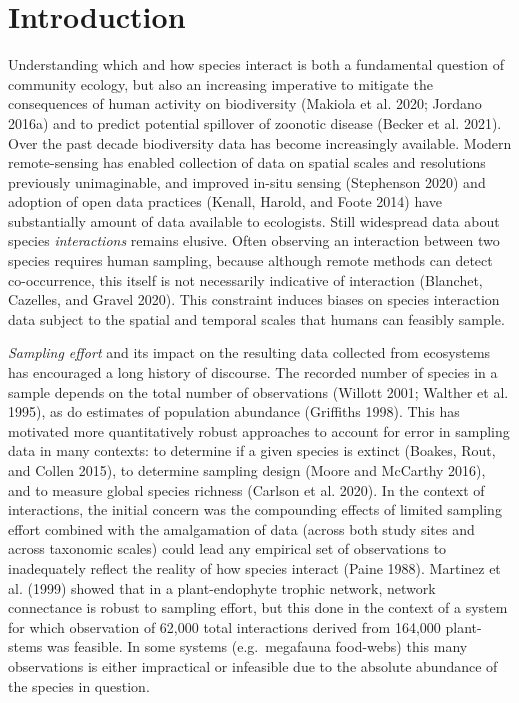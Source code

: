 \documentclass[11pt]{article}
\begin{document}
\hypertarget{introduction}{%
\section{Introduction}\label{introduction}}

Understanding which and how species interact is both a fundamental
question of community ecology, but also an increasing imperative to
mitigate the consequences of human activity on biodiversity (Makiola et
al. 2020; Jordano 2016a) and to predict potential spillover of zoonotic
disease (Becker et al. 2021). Over the past decade biodiversity data has
become increasingly available. Modern remote-sensing has enabled
collection of data on spatial scales and resolutions previously
unimaginable, and improved in-situ sensing (Stephenson 2020) and
adoption of open data practices (Kenall, Harold, and Foote 2014) have
substantially amount of data available to ecologists. Still widespread
data about species \emph{interactions} remains elusive. Often observing
an interaction between two species requires human sampling, because
although remote methods can detect co-occurrence, this itself is not
necessarily indicative of interaction (Blanchet, Cazelles, and Gravel
2020). This constraint induces biases on species interaction data
subject to the spatial and temporal scales that humans can feasibly
sample.

\emph{Sampling effort} and its impact on the resulting data collected
from ecosystems has encouraged a long history of discourse. The recorded
number of species in a sample depends on the total number of
observations (Willott 2001; Walther et al. 1995), as do estimates of
population abundance (Griffiths 1998). This has motivated more
quantitatively robust approaches to account for error in sampling data
in many contexts: to determine if a given species is extinct (Boakes,
Rout, and Collen 2015), to determine sampling design (Moore and McCarthy
2016), and to measure global species richness (Carlson et al. 2020). In
the context of interactions, the initial concern was the compounding
effects of limited sampling effort combined with the amalgamation of
data (across both study sites and across taxonomic scales) could lead
any empirical set of observations to inadequately reflect the reality of
how species interact (Paine 1988). Martinez et al. (1999) showed that in
a plant-endophyte trophic network, network connectance is robust to
sampling effort, but this done in the context of a system for which
observation of 62,000 total interactions derived from 164,000
plant-stems was feasible. In some systems (e.g.~megafauna food-webs)
this many observations is either impractical or infeasible due to the
absolute abundance of the species in question.
\end{document}
